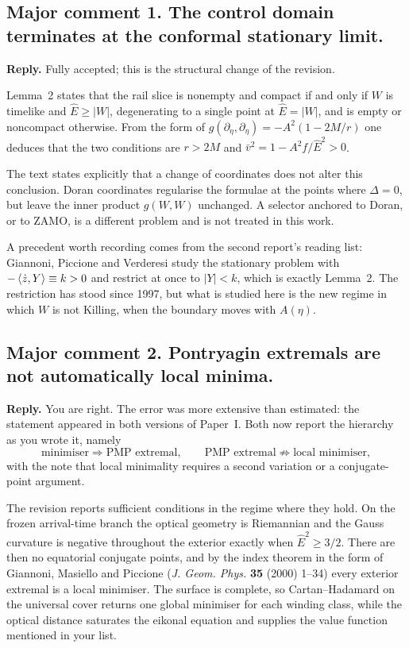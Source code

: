\documentclass{article}
\begin{document}
\subsection{Major comment 1. The control domain terminates at the conformal
stationary limit.}
\textbf{Reply.} Fully accepted; this is the structural change of the revision.

Lemma~2 states that the rail slice is nonempty and compact if and only if \(W\) is
timelike and \(\hat E \geq |W|\), degenerating to a single point at
\(\hat E = |W|\), and is empty or noncompact otherwise. From the form of
\(g(\partial_\eta,\partial_\eta)=-A^2(1-2M/r)\) one deduces that the two conditions
are \(r>2M\) and \(\bar v^2 = 1 - A^2f/\hat E^2 >0\).

The text states explicitly that a change of coordinates does not alter this
conclusion. Doran coordinates regularise the formulae at the points where
\(\Delta = 0\), but leave the inner product \(g(W,W)\) unchanged. A selector
anchored to Doran, or to ZAMO, is a different problem and is not treated in this
work.

A precedent worth recording comes from the second report's reading list: Giannoni,
Piccione and Verderesi study the stationary problem with
\(-\braket{\dot z, Y} \equiv k >0\) and restrict at once to \(|Y|<k\), which is
exactly Lemma~2. The restriction has stood since 1997, but what is studied here is
the new regime in which \(W\) is not Killing, when the boundary moves with
\(A(\eta)\).

\subsection{Major comment 2. Pontryagin extremals are not automatically local
minima.}
\textbf{Reply.} You are right. The error was more extensive than estimated: the
statement appeared in both versions of Paper~I. Both now report the hierarchy as
you wrote it, namely
\[
  \text{minimiser}\Longrightarrow\text{PMP extremal},
  \qquad
  \text{PMP extremal}\nRightarrow\text{local minimiser},
\]
with the note that local minimality requires a second variation or a
conjugate-point argument.

The revision reports sufficient conditions in the regime where they hold. On the
frozen arrival-time branch the optical geometry is Riemannian and the Gauss
curvature is negative throughout the exterior exactly when \(\hat{E}^2 \geq 3/2\).
There are then no equatorial conjugate points, and by the index theorem in the form
of Giannoni, Masiello and Piccione (\emph{J. Geom. Phys.} \textbf{35} (2000) 1--34)
every exterior extremal is a local minimiser. The surface is complete, so
Cartan--Hadamard on the universal cover returns one global minimiser for each
winding class, while the optical distance saturates the eikonal equation and
supplies the value function mentioned in your list.
\end{document}
